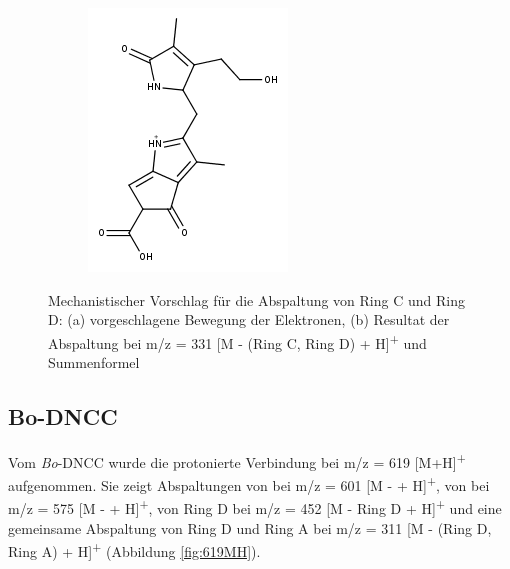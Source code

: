\begin{figure}[!htbp]
\begin{subfigure}[b]{0.5\textwidth}
    \includegraphics[width=\textwidth]{figures/Kapitel7/Kataboliten/fragmentation_structures/VWA_Katabolit_617-RingD-RingC_331.png}
    \caption{}
    \label{fig:331MH}
  \end{subfigure}
  \caption[Abspaltungsmechanismus von Ring C und Ring D bei \textit{Bo}-DYCC, Quelle: Autor]{Mechanistischer Vorschlag für die Abspaltung von Ring C und Ring D: (a) vorgeschlagene Bewegung der Elektronen, (b) Resultat der Abspaltung bei m/z = 331 [M - (Ring C, Ring D) + H]\textsuperscript{+} und Summenformel }
\end{figure}

\pagebreak
\subsection{Bo-DNCC} \label{sec:ESIMSBoDNCC}

Vom \textit{Bo}-DNCC wurde die protonierte Verbindung bei m/z = 619 [M+H]\textsuperscript{+} aufgenommen. Sie zeigt Abspaltungen von  bei m/z = 601 [M -  + H]\textsuperscript{+}, von  bei m/z = 575 [M -  + H]\textsuperscript{+}, von Ring D bei m/z = 452 [M - Ring D + H]\textsuperscript{+} und eine gemeinsame Abspaltung von Ring D und Ring A bei m/z = 311 [M - (Ring D, Ring A) + H]\textsuperscript{+} (Abbildung \ref{fig:619MH}). 

